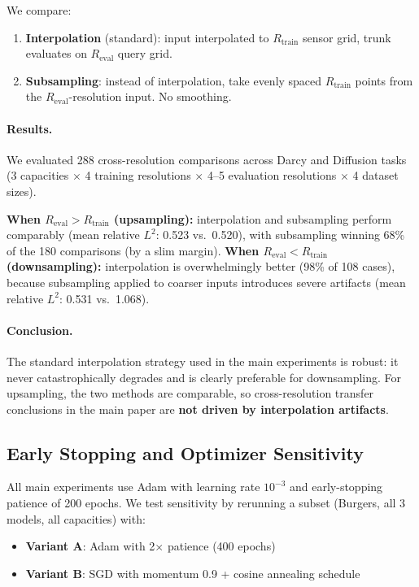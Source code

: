 \documentclass[11pt]{article}
\begin{document}
We compare:
\begin{enumerate}
  \item[(a)] \textbf{Interpolation} (standard): input interpolated to
    $R_{\mathrm{train}}$ sensor grid, trunk evaluates on
    $R_{\mathrm{eval}}$ query grid.
  \item[(b)] \textbf{Subsampling}: instead of interpolation, take
    evenly spaced $R_{\mathrm{train}}$ points from the
    $R_{\mathrm{eval}}$-resolution input. No smoothing.
\end{enumerate}

\paragraph{Results.}
We evaluated 288 cross-resolution comparisons across Darcy and
Diffusion tasks (3 capacities $\times$ 4 training resolutions $\times$
4--5 evaluation resolutions $\times$ 4 dataset sizes).

\textbf{When $R_{\mathrm{eval}} > R_{\mathrm{train}}$ (upsampling):}
interpolation and subsampling perform comparably (mean relative
$L^2$: 0.523 vs.\ 0.520), with subsampling winning 68\% of the 180
comparisons (by a slim margin).
\textbf{When $R_{\mathrm{eval}} < R_{\mathrm{train}}$ (downsampling):}
interpolation is overwhelmingly better (98\% of 108 cases), because
subsampling applied to coarser inputs introduces severe artifacts
(mean relative $L^2$: 0.531 vs.\ 1.068).

\paragraph{Conclusion.}
The standard interpolation strategy used in the main experiments is
robust: it never catastrophically degrades and is clearly preferable
for downsampling. For upsampling, the two methods are comparable,
so cross-resolution transfer conclusions in the main paper are
\textbf{not driven by interpolation artifacts}.

\subsection{Early Stopping and Optimizer Sensitivity}
\label{app:optimizer}

All main experiments use Adam with learning rate $10^{-3}$ and
early-stopping patience of 200 epochs. We test sensitivity by
rerunning a subset (Burgers, all 3 models, all capacities) with:
\begin{itemize}
  \item \textbf{Variant A}: Adam with 2$\times$ patience (400 epochs)
  \item \textbf{Variant B}: SGD with momentum 0.9 + cosine annealing schedule
\end{itemize}
\end{document}
